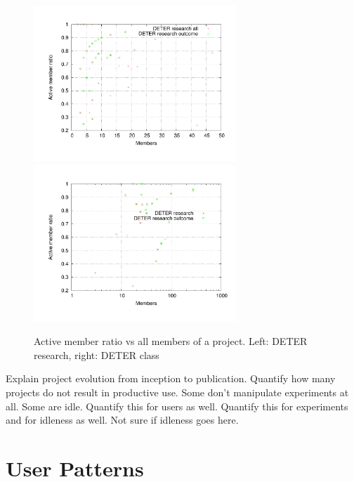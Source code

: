 \documentclass[10pt, twocolumn]{article} %
\begin{document}
\begin{figure}[htbp] \begin{center} \includegraphics[width=3in,
type=pdf,ext=.pdf,read=.pdf]{figs/proj.uservsauserres.gnu}
\includegraphics[width=3in,
type=pdf,ext=.pdf,read=.pdf]{figs/proj.uservsausercl.gnu}
\caption{Active member ratio vs all members of a project. Left: DETER
research, right: DETER class} \label{projuservsauser} \end{center}
\end{figure}

Explain project evolution from inception to publication. Quantify how
many projects do not result in productive use. Some don't manipulate
experiments at all. Some are idle. Quantify this for users as well.
Quantify this for experiments and for idleness as well. Not sure if
idleness goes here.


\section{User Patterns}
\end{document}
